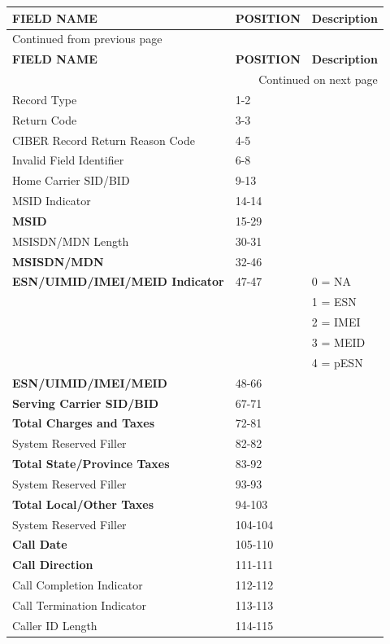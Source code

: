 \documentclass[12pt,twoside]{article}
\begin{document}
\begin{longtable}{l|l|l}
\hline
\textbf{FIELD NAME} & \textbf{POSITION} & \textbf{Description}\\
\hline
\endfirsthead
\multicolumn{3}{l}{Continued from previous page} \\
\hline

\textbf{FIELD NAME} & \textbf{POSITION} & \textbf{Description} \\

\hline
\endhead
\hline\multicolumn{3}{r}{Continued on next page} \\
\endfoot
\endlastfoot
\hline
Record Type & 1-2 & \\
Return Code & 3-3 & \\
CIBER Record Return Reason Code & 4-5 & \\
Invalid Field Identifier & 6-8 & \\
Home Carrier SID/BID & 9-13 & \\
MSID Indicator & 14-14 & \\
\textbf{MSID} & 15-29 & \\
MSISDN/MDN Length & 30-31 & \\
\textbf{MSISDN/MDN} & 32-46 & \\
\textbf{ESN/UIMID/IMEI/MEID Indicator} & 47-47 & 0 = NA\\
 &  & 1 = ESN\\
 &  & 2 = IMEI\\
 &  & 3 = MEID\\
 &  & 4 = pESN\\
\textbf{ESN/UIMID/IMEI/MEID} & 48-66 & \\
\textbf{Serving Carrier SID/BID} & 67-71 & \\
\textbf{Total Charges and Taxes} & 72-81 & \\
System Reserved Filler & 82-82 & \\
\textbf{Total State/Province Taxes} & 83-92 & \\
System Reserved Filler & 93-93 & \\
\textbf{Total Local/Other Taxes} & 94-103 & \\
System Reserved Filler & 104-104 & \\
\textbf{Call Date} & 105-110 & \\
\textbf{Call Direction} & 111-111 & \\
Call Completion Indicator & 112-112 & \\
Call Termination Indicator & 113-113 & \\
Caller ID Length & 114-115 & \\

\end{longtable}
\end{document}
